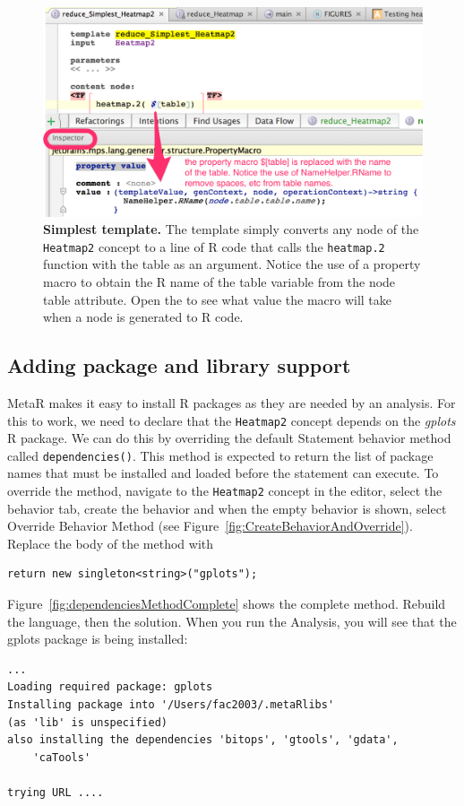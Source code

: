 \begin{figure}[h!tbp]
  \centering
  \includegraphics[width=\figWidthWide]{figures/SimplestTemplate.png}
\caption[Simplest template.]{\textbf{Simplest template.} The template simply converts any node of the \texttt{Heatmap2} concept to a line of R code that calls the \texttt{heatmap.2} function with the table as an argument. Notice the use of a property macro to obtain the R name of the table variable from the node table attribute. Open the \inspectorTabIcon{} to see what value the macro will take when a node is generated to R code.}
\label{fig:SimplestTemplate}
\end{figure}

\subsection{Adding package and library support}
MetaR makes it easy to install R packages as they are needed by an analysis. For this to work, we need to declare that the \texttt{Heatmap2} concept depends on the \textit{gplots} R package.  We can do this by overriding the default Statement behavior method called \texttt{dependencies()}. This method is expected to return the list of package names that must be installed and loaded before the statement can execute. To override the method, navigate to the \texttt{Heatmap2} concept in the editor, select the behavior tab, create the behavior and when the empty behavior is shown, select Override Behavior Method (see Figure~\ref{fig:CreateBehaviorAndOverride}).
Replace the body of the method with 
\begin{lstlisting}
return new singleton<string>("gplots");
\end{lstlisting}
Figure~\ref{fig:dependenciesMethodComplete} shows the complete  method. Rebuild the language, then the solution. When you run the Analysis, you will see that the gplots package is being installed:
\begin{lstlisting}
...
Loading required package: gplots
Installing package into '/Users/fac2003/.metaRlibs'
(as 'lib' is unspecified)
also installing the dependencies 'bitops', 'gtools', 'gdata', 
    'caTools'

trying URL ....
\end{lstlisting}

